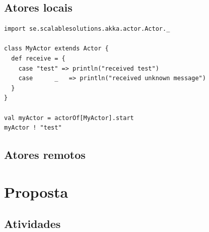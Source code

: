 \documentclass{beamer}
\begin{document}
\subsection{Atores locais}
\begin{frame}[fragile]
\begin{verbatim}
import se.scalablesolutions.akka.actor.Actor._

class MyActor extends Actor {
  def receive = {
    case "test" => println("received test")
    case      _   => println("received unknown message")
  }
}
	    
val myActor = actorOf[MyActor].start
myActor ! "test"
\end{verbatim}
\end{frame}

\subsection{Atores remotos}
\section{Proposta} 

\subsection{Atividades}
\end{document}

